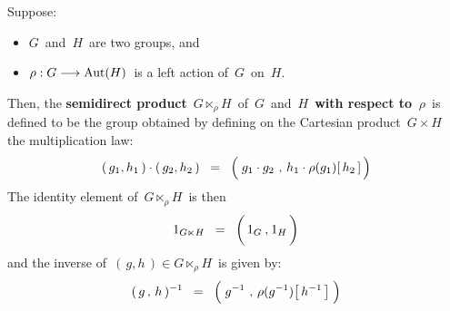 \begin{definition}
\mbox{}
\vskip 0.1cm
\noindent
Suppose:
\begin{itemize}
\item
	$G$\, and \,$H$\, are two groups, and
\item
	$\rho : G \longrightarrow \textnormal{Aut}(H)$\,
	is a left action of \,$G$\, on \,$H$.\,
\end{itemize}
Then, the \textbf{semidirect product} \,$G \ltimes_{\rho}\! H$\,
of \,$G$\, and \,$H$\, \textbf{\color{red}with respect to \,$\rho$}\,
is defined to be the group
obtained by defining on the Cartesian product
\,$G \times H$\,
the multiplication law:
\begin{equation*}
(\,g_{1},h_{1}\,) \cdot (\,g_{2},h_{2}\,)
\;\; = \;\;
	\left(\;
		\overset{{\color{white}1}}{g_{1}} \cdot g_{2}
		\;\overset{{\color{white}1}}{,}\;
		h_{1} \cdot \rho(g_{1})\!\left[\,h_{2}\,\right]
		\,\right)
\end{equation*}
The identity element of \,$G \ltimes_{\rho}\! H$\, is then
\begin{equation*}
1_{G \ltimes H}
\;\; = \;\;
	\left(\,
		\overset{{\color{white}1}}{1_{G}}
		\,\overset{{\color{white}1}}{,}\,
		1_{H}
		\,\right)
\end{equation*}
and the inverse of \,$(\,g,h\,) \in G \ltimes_{\rho}\! H$\, is given by:
\begin{equation*}
(\, g \,,\, h \,)^{-1}
\;\; = \;\;
	\left(\;
		g^{-1}
		\;\overset{{\color{white}1}}{,}\;
		\overset{{\color{white}1}}{\rho}(g^{-1})\!\left[\, h^{-1} \,\right]
		\;\right)
\end{equation*}
\end{definition}



